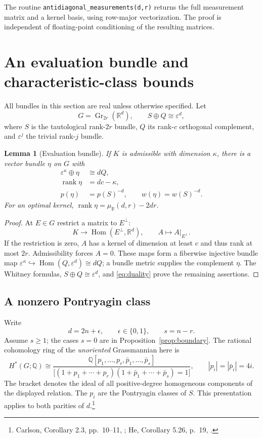 \documentclass[11pt]{article}
\newtheorem{lemma}[theorem]{Lemma}
\theoremstyle{definition}
\newcommand{\R}{\mathbb R}
\newcommand{\Q}{\mathbb Q}
\newcommand{\eps}{\varepsilon}
\newcommand{\Gr}{\operatorname{Gr}}
\newcommand{\rank}{\operatorname{rank}}
\newcommand{\Hom}{\operatorname{Hom}}
\newcommand{\muR}{\mu_{\R}}
\begin{document}
The routine \texttt{antidiagonal\_measurements(d,r)} returns the full measurement matrix and a kernel basis, using row-major vectorization. The proof is independent of floating-point conditioning of the resulting matrices.

\section{An evaluation bundle and characteristic-class bounds}\label{sec:characteristic}
All bundles in this section are real unless otherwise specified. Let
\[
 G=\Gr_{2r}(\R^d),\qquad S\oplus Q\cong\eps^d,
\]
where $S$ is the tautological rank-$2r$ bundle, $Q$ its rank-$c$ orthogonal complement, and $\eps^j$ the trivial rank-$j$ bundle.

\begin{lemma}[Evaluation bundle]\label{lem:evaluation}
If $K$ is admissible with dimension $\kappa$, there is a vector bundle $\eta$ on $G$ with
\begin{align}
 \eps^\kappa\oplus\eta&\cong dQ,\label{eq:bundle}\\
 \rank\eta&=dc-\kappa,\label{eq:etarank}\\
 p(\eta)&=p(S)^{-d},\qquad
 w(\eta)=w(S)^{-d}.\label{eq:classes}
\end{align}
For an optimal kernel, $\rank\eta=\muR(d,r)-2dr$.
\end{lemma}
\begin{proof}
At $E\in G$ restrict a matrix to $E^\perp$:
\[
 K\longrightarrow\Hom(E^\perp,\R^d),\qquad A\longmapsto A|_{E^\perp}.
\]
If the restriction is zero, $A$ has a kernel of dimension at least $c$ and thus rank at most $2r$. Admissibility forces $A=0$. These maps form a fiberwise injective bundle map $\eps^\kappa\hookrightarrow\Hom(Q,\eps^d)\cong dQ$; a bundle metric supplies the complement $\eta$. The Whitney formulas, $S\oplus Q\cong\eps^d$, and \eqref{eq:duality} prove the remaining assertions.
\end{proof}

\subsection{A nonzero Pontryagin class}
Write
\[
 d=2n+\epsilon,\qquad \epsilon\in\{0,1\},\qquad s=n-r.
\]
Assume $s\geq1$; the cases $s=0$ are in Proposition~\ref{prop:boundary}. The rational cohomology ring of the \emph{unoriented} Grassmannian here is
\begin{equation}\label{eq:rationalring}
 H^*(G;\Q)\cong
 \frac{\Q[p_1,\ldots,p_r,\bar p_1,\ldots,\bar p_s]}
 {\big[(1+p_1+\cdots+p_r)(1+\bar p_1+\cdots+\bar p_s)=1\big]},
 \qquad |p_i|=|\bar p_i|=4i.
\end{equation}
The bracket denotes the ideal of all positive-degree homogeneous components of the displayed relation. The $p_i$ are the Pontryagin classes of $S$. This presentation applies to both parities of $d$.\footnote{Carlson, Corollary 2.3, pp.~10--11, \cite{carlson}; He, Corollary 5.26, p.~19, \cite{he}.}
\end{document}
